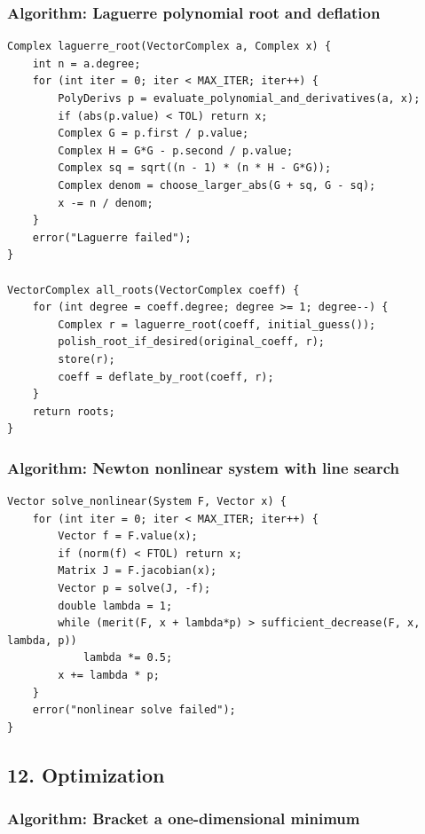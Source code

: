 \documentclass[11pt]{article}
\begin{document}
\subsubsection{Algorithm: Laguerre polynomial root and deflation}\label{algorithm-laguerre-polynomial-root-and-deflation}

\begin{verbatim}
Complex laguerre_root(VectorComplex a, Complex x) {
    int n = a.degree;
    for (int iter = 0; iter < MAX_ITER; iter++) {
        PolyDerivs p = evaluate_polynomial_and_derivatives(a, x);
        if (abs(p.value) < TOL) return x;
        Complex G = p.first / p.value;
        Complex H = G*G - p.second / p.value;
        Complex sq = sqrt((n - 1) * (n * H - G*G));
        Complex denom = choose_larger_abs(G + sq, G - sq);
        x -= n / denom;
    }
    error("Laguerre failed");
}

VectorComplex all_roots(VectorComplex coeff) {
    for (int degree = coeff.degree; degree >= 1; degree--) {
        Complex r = laguerre_root(coeff, initial_guess());
        polish_root_if_desired(original_coeff, r);
        store(r);
        coeff = deflate_by_root(coeff, r);
    }
    return roots;
}
\end{verbatim}

\subsubsection{Algorithm: Newton nonlinear system with line search}\label{algorithm-newton-nonlinear-system-with-line-search}

\begin{verbatim}
Vector solve_nonlinear(System F, Vector x) {
    for (int iter = 0; iter < MAX_ITER; iter++) {
        Vector f = F.value(x);
        if (norm(f) < FTOL) return x;
        Matrix J = F.jacobian(x);
        Vector p = solve(J, -f);
        double lambda = 1;
        while (merit(F, x + lambda*p) > sufficient_decrease(F, x, lambda, p))
            lambda *= 0.5;
        x += lambda * p;
    }
    error("nonlinear solve failed");
}
\end{verbatim}

\subsection{12. Optimization}\label{optimization}

\subsubsection{Algorithm: Bracket a one-dimensional minimum}\label{algorithm-bracket-a-one-dimensional-minimum}
\end{document}
